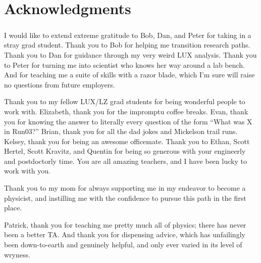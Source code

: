 

\bigskip


\begingroup

\let\clearpage\relax
\let\cleardoublepage\relax
\let\cleardoublepage\relax

\chapter*{Acknowledgments}

\paragraph{} I would like to extend extreme gratitude to Bob, Dan, and Peter for taking in a stray grad student. Thank you to Bob for helping me transition research paths. Thank you to Dan for guidance through my very weird LUX analysis. Thank you to Peter for turning me into scientist who knows her way around a lab bench. And for teaching me a suite of skills with a razor blade, which I'm sure will raise no questions from future employers. %

Thank you to my fellow LUX/LZ grad students for being wonderful people to work with. Elizabeth, thank you for the impromptu coffee breaks. Evan, thank you for knowing the answer to literally every question of the form ``What was X in Run03?''  Brian, thank you for all the dad jokes and Mickelson trail runs. Kelsey, thank you for being an awesome officemate. Thank you to Ethan, Scott Hertel, Scott Kravitz, and Quentin for being so generous with your engineerly and postdoctorly time. You are all amazing teachers, and I have been lucky to work with you.     %

Thank you to my mom for always supporting me in my endeavor to become a physicist, and instilling me with the confidence to pursue this path in the first place. %

Patrick, thank you for teaching me pretty much all of physics; there has never been a better TA. And thank you for dispensing advice, which has unfailingly been down-to-earth and genuinely helpful, and only ever varied in its level of wryness.

